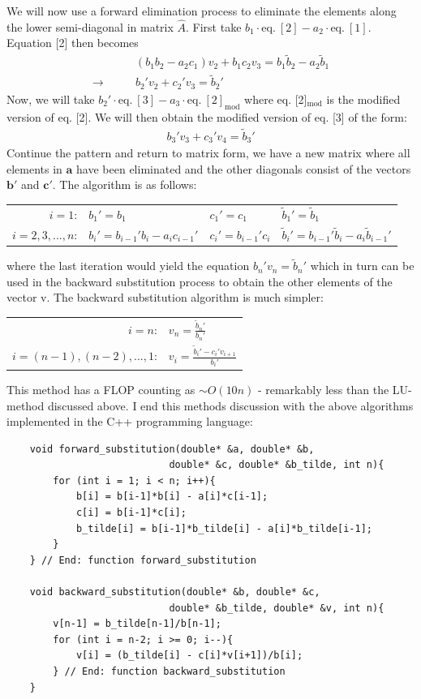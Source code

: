 \documentclass[11pt]{article}
\begin{document}
			We will now use a forward elimination process to eliminate the elements along the lower semi-diagonal in matrix $\hat{A}$. First take $b_1\cdot \mathrm{eq. \ [2]} - a_2 \cdot \mathrm{eq. \ [1]}$. Equation [2] then becomes 
			\begin{align*}
				& (b_1b_2 - a_2c_1)v_2 + b_1c_2v_3 = b_1\tilde{b}_2 - a_2\tilde{b}_1 \\
				\rightarrow \qquad & b_2'v_2 + c_2' v_3 = \tilde{b}_2'
			\end{align*}
			Now, we will take $b_2' \cdot \mathrm{eq. \ [3]} - a_3 \cdot \mathrm{eq. \ [2]_{mod}}$ where eq. [2]$_\mathrm{mod}$ is the modified version of eq. [2]. We will then obtain the modified version of eq. [3] of the form:
			\begin{align*}
				b_3'v_3 + c_3'v_4 = \tilde{b}_3'
			\end{align*}
			Continue the pattern and return to matrix form, we have a new matrix where all elements in $\mathbf{a}$ have been eliminated and the other diagonals consist of the vectors $\mathbf{b'}$ and $\mathbf{c}'$. The algorithm is as follows:\\
			\begin{center}
				\begin{tabular}{rlll}
					$i = 1$:					&	$b_1' = b_1$								&	$c_1' = c_1$				&	$\tilde{b}_1' = \tilde{b}_1$ \\
					$i = 2, 3, ..., n$:	&	$b_i' = b_{i-1}'b_i - a_ic_{i-1}'$		&	$c_i' = b_{i-1}'c_i$	&	$\tilde{b}_i' = b_{i-1}'\tilde{b}_i - a_i \tilde{b}_{i-1}'$
				\end{tabular}	
			\end{center}
			where the last iteration would yield the equation $b_n'v_n = \tilde{b}_n'$ which in turn can be used in the backward substitution process to obtain the other elements of the vector $\mathrm{v}$. The backward substitution algorithm is much simpler:
			\begin{center}
				\begin{tabular}{rl}
					$i = n$:								&	$v_n = \frac{\tilde{b}_n'}{b_n'}$ \\[9pt]
					$i = (n-1), (n-2), ..., 1$:		&	$v_i = \frac{\tilde{b}_i' - c_i'v_{i+1}}{b_i'}$
				\end{tabular}
			\end{center}
			This method has a FLOP counting as $\sim O(10n)$ - remarkably less than the LU-method discussed above.
			I end this methods discussion with the above algorithms implemented in the C++ programming language:
			\begin{lstlisting}
	void forward_substitution(double* &a, double* &b, 
							double* &c, double* &b_tilde, int n){
		for (int i = 1; i < n; i++){
			b[i] = b[i-1]*b[i] - a[i]*c[i-1];
			c[i] = b[i-1]*c[i];
			b_tilde[i] = b[i-1]*b_tilde[i] - a[i]*b_tilde[i-1];
		}
	} // End: function forward_substitution

	void backward_substitution(double* &b, double* &c, 
							double* &b_tilde, double* &v, int n){
		v[n-1] = b_tilde[n-1]/b[n-1];
		for (int i = n-2; i >= 0; i--){
			v[i] = (b_tilde[i] - c[i]*v[i+1])/b[i];
		} // End: function backward_substitution
	}
			\end{lstlisting}
			
\end{document}
